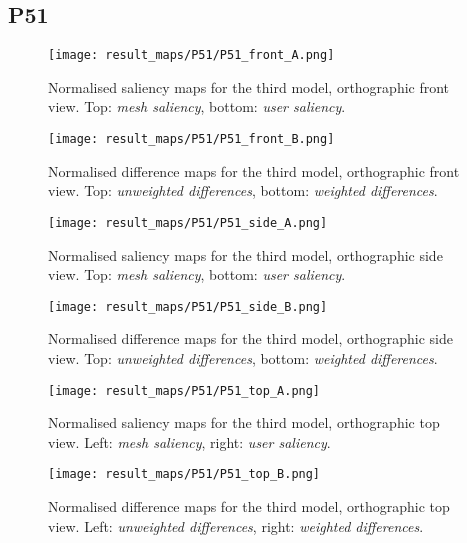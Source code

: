 		\subsection{P51}
		\label{sec:results_p51}
%
%
\begin{figure}[htb]
	\centering
	\texttt{[image: result\_maps/P51/P51\_front\_A.png]}\\ %
	\caption{Normalised saliency maps for the third model, orthographic front view. Top: \textit{mesh saliency}, bottom: \textit{user saliency}.}
	\label{fig:results_p51_front_a}
\end{figure}
\begin{figure}[htb]
	\centering
	\texttt{[image: result\_maps/P51/P51\_front\_B.png]}\\ %
	\caption{Normalised difference maps for the third model, orthographic front view. Top: \textit{unweighted differences}, bottom: \textit{weighted differences}.}
	\label{fig:results_p51_front_b}
\end{figure}

\begin{figure}[htb]
	\centering
	\texttt{[image: result\_maps/P51/P51\_side\_A.png]}\\ %
	\caption{Normalised saliency maps for the third model, orthographic side view. Top: \textit{mesh saliency}, bottom: \textit{user saliency}.}
	\label{fig:results_p51_side_a}
\end{figure}
\begin{figure}[htb]
	\centering
	\texttt{[image: result\_maps/P51/P51\_side\_B.png]}\\ %
	\caption{Normalised difference maps for the third model, orthographic side view. Top: \textit{unweighted differences}, bottom: \textit{weighted differences}.}
	\label{fig:results_p51_side_b}
\end{figure}

\begin{figure}[htb]
	\centering
	\texttt{[image: result\_maps/P51/P51\_top\_A.png]}\\ %
	\caption{Normalised saliency maps for the third model, orthographic top view. Left: \textit{mesh saliency}, right: \textit{user saliency}.}
	\label{fig:results_p51_top_a}
\end{figure}
\begin{figure}[htb]
	\centering
	\texttt{[image: result\_maps/P51/P51\_top\_B.png]}\\ %
	\caption{Normalised difference maps for the third model, orthographic top view. Left: \textit{unweighted differences}, right: \textit{weighted differences}.}
	\label{fig:results_p51_top_b}
\end{figure}
%
%

